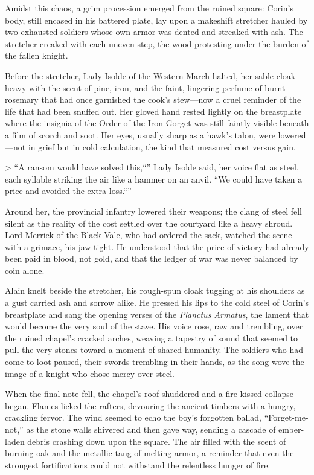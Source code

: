 \documentclass[11pt,twoside]{book}
\begin{document}
Amidst this chaos, a grim procession emerged from the ruined square: Corin's body, still encased in his battered plate, lay upon a makeshift stretcher hauled by two exhausted soldiers whose own armor was dented and streaked with ash.  The stretcher creaked with each uneven step, the wood protesting under the burden of the fallen knight.

Before the stretcher, Lady Isolde of the Western March halted, her sable cloak heavy with the scent of pine, iron, and the faint, lingering perfume of burnt rosemary that had once garnished the cook's stew---now a cruel reminder of the life that had been snuffed out.  Her gloved hand rested lightly on the breastplate where the insignia of the Order of the Iron Gorget was still faintly visible beneath a film of scorch and soot.  Her eyes, usually sharp as a hawk's talon, were lowered---not in grief but in cold calculation, the kind that measured cost versus gain.

> ``A ransom would have solved this,``'' Lady Isolde said, her voice flat as steel, each syllable striking the air like a hammer on an anvil. ``We could have taken a price and avoided the extra loss.``''

Around her, the provincial infantry lowered their weapons; the clang of steel fell silent as the reality of the cost settled over the courtyard like a heavy shroud.  Lord Merrick of the Black Vale, who had ordered the sack, watched the scene with a grimace, his jaw tight.  He understood that the price of victory had already been paid in blood, not gold, and that the ledger of war was never balanced by coin alone.

Alain knelt beside the stretcher, his rough-spun cloak tugging at his shoulders as a gust carried ash and sorrow alike.  He pressed his lips to the cold steel of Corin's breastplate and sang the opening verses of the \emph{Planctus Armatus}, the lament that would become the very soul of the stave.  His voice rose, raw and trembling, over the ruined chapel's cracked arches, weaving a tapestry of sound that seemed to pull the very stones toward a moment of shared humanity.  The soldiers who had come to loot paused, their swords trembling in their hands, as the song wove the image of a knight who chose mercy over steel.

When the final note fell, the chapel's roof shuddered and a fire-kissed collapse began.  Flames licked the rafters, devouring the ancient timbers with a hungry, crackling fervor.  The wind seemed to echo the boy's forgotten ballad, ``Forget-me-not,'' as the stone walls shivered and then gave way, sending a cascade of ember-laden debris crashing down upon the square.  The air filled with the scent of burning oak and the metallic tang of melting armor, a reminder that even the strongest fortifications could not withstand the relentless hunger of fire.
\end{document}
